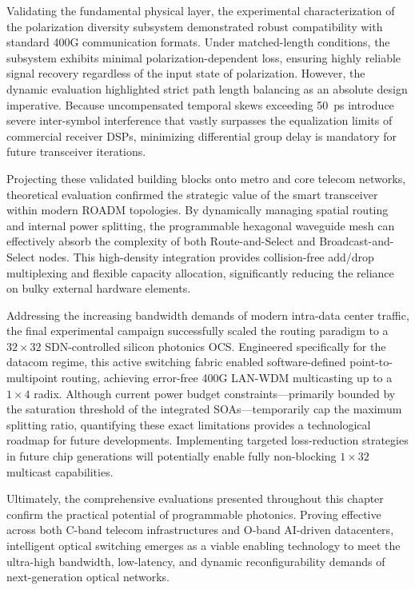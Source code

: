 Validating the fundamental physical layer, the experimental characterization of the polarization 
diversity subsystem demonstrated robust compatibility with standard 400G communication formats. 
Under matched-length conditions, the subsystem exhibits minimal polarization-dependent loss, 
ensuring highly reliable signal recovery regardless of the input state of polarization. However, 
the dynamic evaluation highlighted strict path length balancing as an absolute design imperative. 
Because uncompensated temporal skews exceeding 50~ps introduce severe inter-symbol interference 
that vastly surpasses the equalization limits of commercial receiver DSPs, minimizing differential 
group delay is mandatory for future transceiver iterations.

Projecting these validated building blocks onto metro and core telecom networks, theoretical 
evaluation confirmed the strategic value of the smart transceiver within modern ROADM topologies. 
By dynamically managing spatial routing and internal power splitting, the programmable hexagonal 
waveguide mesh can effectively absorb the complexity of both Route-and-Select and 
Broadcast-and-Select nodes. This high-density integration provides collision-free add/drop 
multiplexing and flexible capacity allocation, significantly reducing the reliance on bulky 
external hardware elements. 

Addressing the increasing bandwidth demands of modern intra-data center traffic, the final 
experimental campaign successfully scaled the routing paradigm to a $32\times32$ SDN-controlled 
silicon photonics OCS. Engineered specifically for the datacom regime, this active switching 
fabric enabled software-defined point-to-multipoint routing, achieving error-free 400G LAN-WDM 
multicasting up to a $1\times4$ radix. Although current power budget constraints—primarily bounded 
by the saturation threshold of the integrated SOAs—temporarily cap the maximum splitting ratio, 
quantifying these exact limitations provides a technological roadmap for future developments. 
Implementing targeted loss-reduction strategies in future chip generations will potentially enable 
fully non-blocking $1\times32$ multicast capabilities.

Ultimately, the comprehensive evaluations presented throughout this chapter confirm the practical 
potential of programmable photonics. Proving effective across both C-band telecom infrastructures 
and O-band AI-driven datacenters, intelligent optical switching emerges as a viable enabling 
technology to meet the ultra-high bandwidth, low-latency, and dynamic reconfigurability demands of 
next-generation optical networks.
